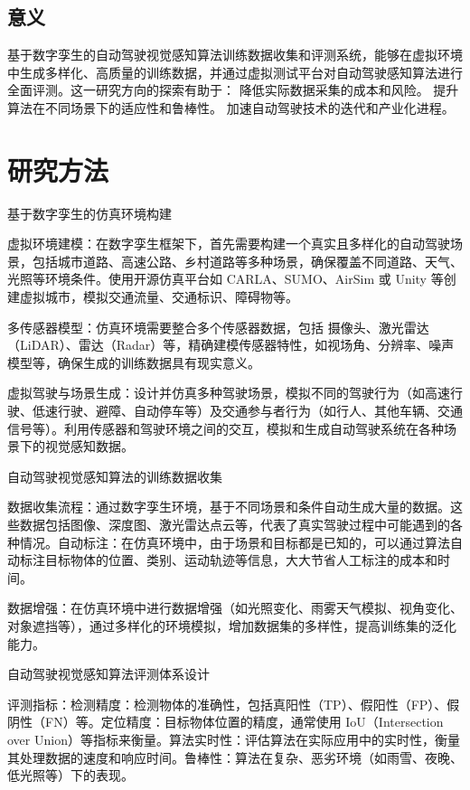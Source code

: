 \subsection{意义}
基于数字孪生的自动驾驶视觉感知算法训练数据收集和评测系统，能够在虚拟环境中生成多样化、高质量的训练数据，并通过虚拟测试平台对自动驾驶感知算法进行全面评测。这一研究方向的探索有助于：
降低实际数据采集的成本和风险。
提升算法在不同场景下的适应性和鲁棒性。
加速自动驾驶技术的迭代和产业化进程。



\section{研究方法}

基于数字孪生的仿真环境构建

虚拟环境建模：在数字孪生框架下，首先需要构建一个真实且多样化的自动驾驶场景，包括城市道路、高速公路、乡村道路等多种场景，确保覆盖不同道路、天气、光照等环境条件。使用开源仿真平台如 CARLA、SUMO、AirSim 或 Unity 等创建虚拟城市，模拟交通流量、交通标识、障碍物等。

多传感器模型：仿真环境需要整合多个传感器数据，包括 摄像头、激光雷达（LiDAR）、雷达（Radar）等，精确建模传感器特性，如视场角、分辨率、噪声模型等，确保生成的训练数据具有现实意义。

虚拟驾驶与场景生成：设计并仿真多种驾驶场景，模拟不同的驾驶行为（如高速行驶、低速行驶、避障、自动停车等）及交通参与者行为（如行人、其他车辆、交通信号等）。利用传感器和驾驶环境之间的交互，模拟和生成自动驾驶系统在各种场景下的视觉感知数据。

自动驾驶视觉感知算法的训练数据收集

数据收集流程：通过数字孪生环境，基于不同场景和条件自动生成大量的数据。这些数据包括图像、深度图、激光雷达点云等，代表了真实驾驶过程中可能遇到的各种情况。自动标注：在仿真环境中，由于场景和目标都是已知的，可以通过算法自动标注目标物体的位置、类别、运动轨迹等信息，大大节省人工标注的成本和时间。

数据增强：在仿真环境中进行数据增强（如光照变化、雨雾天气模拟、视角变化、对象遮挡等），通过多样化的环境模拟，增加数据集的多样性，提高训练集的泛化能力。

自动驾驶视觉感知算法评测体系设计

评测指标：检测精度：检测物体的准确性，包括真阳性（TP）、假阳性（FP）、假阴性（FN）等。定位精度：目标物体位置的精度，通常使用 IoU（Intersection over Union）等指标来衡量。算法实时性：评估算法在实际应用中的实时性，衡量其处理数据的速度和响应时间。鲁棒性：算法在复杂、恶劣环境（如雨雪、夜晚、低光照等）下的表现。

